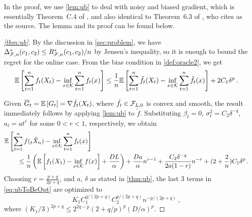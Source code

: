 In the proof, we use \cref{lem:ub} to deal with noisy and biased gradient, which is essentially Theorem~C.4 of \cite{MahdaviPhd:2014}, and also identical to Theorem~6.3 of \cite{Bu:Convex14}, who cites \cite{Dekel:minibatch12} as the source.
The lemma and its proof can be found below.

\begin{proof}[\cref{thm:ub}]
By the discussion in \cref{sec:problem}, we have $\Delta^*_{\mathcal{F},n}(c_1,c_2) \le R^*_{\mathcal{F},n}(c_1,c_2)/n$ by Jensen's inequality, so it is enough to bound the regret for the online case.
From the bias condition in \cref{def:oracle2}, we get
\begin{align*}
 \mathbb{E}\left[ \sum_{t=1}^n f_t(X_t) - \inf_{x \in \mathcal{K}}\sum_{t=1}^n f_t(x) \right]
 \le \frac{1}{n}\mathbb{E}\left[ \sum_{t=1}^n \tilde{f}_t(X_t) - \inf_{x \in \mathcal{K}}\sum_{t=1}^n \tilde{f}_t(x) \right] +2C_1 \delta^p
 \,.
\end{align*}

Given $\overline{G}_t=\mathbb{E}\left[G_t\right] = \nabla \tilde{f}_t(X_t)$, where $\tilde{f}_t\in \mathcal{F}_{L,0}$ is convex and smooth,
the result immediately follows by applying \cref{lem:ub} to $\tilde{f}$.
Substituting
 $\beta_t = 0$, $\sigma^2_t = C_2 \delta^{-q}$, $a_t=a t^r$ for some $0<r<1$, respectively, we obtain
 \begin{align}
\MoveEqLeft
\EE{ \sum_{t=1}^n f(_t\hat X_n) - \inf_{x \in \cK} \sum_{t=1}^n f_t(x)} \nonumber \\
&\le \frac{1}{n}\left(\EE{f_1(X_1)-\inf_{x \in \cK}f(x)}+\frac{DL}{\alpha}  \right) %
+\frac{Da}{\alpha} n^{r-1}+\dfrac{C_2 \delta^{-q}}{2a(1-r)}n^{-r}+ (2+\dfrac{2}{n})C_1\delta^p \,.
\label{eq:ubToBeOpt}
 \end{align}
 Choosing $r = \frac{p+q}{2p+q}$, and $a$, $\delta$ as stated in \cref{thm:ub}, the last $3$ terms in \eqref{eq:ubToBeOpt} are optimized to
 \[
 K_1 C_1^{q/(2p+q)} C_2^{p/(2p+q)} n ^{-p/(2p+q)} \,,
 \]
 where
 $(K_1/3)^{2p+q} \le 2^{2q-p}\left(2+q/p \right)^p \left(D/\alpha\right)^{p}$.


\end{proof}
